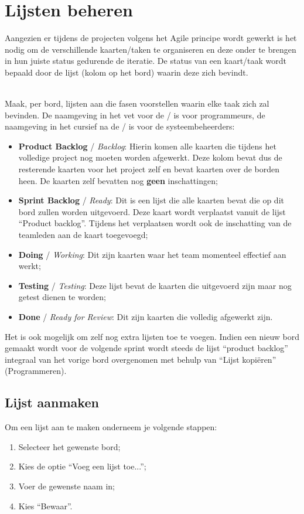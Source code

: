 \chapter{Lijsten beheren}\label{chapter:lijsten_beheren}

Aangezien er tijdens de projecten volgens het Agile principe wordt gewerkt is het nodig om de verschillende kaarten/taken te organiseren en deze onder te brengen in hun juiste status gedurende de iteratie. De status van een kaart/taak wordt bepaald door de lijst (kolom op het bord) waarin deze zich bevindt.

\noindent
\\Maak, per bord, lijsten aan die fasen voorstellen waarin elke taak zich zal bevinden. De naamgeving in het vet voor de / is voor programmeurs, de naamgeving in het cursief na de / is voor de systeembeheerders:
\begin{itemize}
	\item \textbf{Product Backlog} / \textit{Backlog}: Hierin komen alle kaarten die tijdens het volledige project nog moeten worden afgewerkt. Deze kolom bevat dus de resterende kaarten voor het project zelf en bevat kaarten over de borden heen. De kaarten zelf bevatten nog \textbf{geen} inschattingen;
	\item \textbf{Sprint Backlog} / \textit{Ready}: Dit is een lijst die alle kaarten bevat die op dit bord zullen worden uitgevoerd. Deze kaart wordt verplaatst vanuit de lijst ``Product backlog''. Tijdens het verplaatsen wordt ook de inschatting van de teamleden aan de kaart toegevoegd;
	\item \textbf{Doing} / \textit{Working}: Dit zijn kaarten waar het team momenteel effectief aan werkt;
	\item \textbf{Testing} / \textit{Testing}: Deze lijst bevat de kaarten die uitgevoerd zijn maar nog getest dienen te worden;
	\item \textbf{Done} / \textit{Ready for Review}: Dit zijn kaarten die volledig afgewerkt zijn.
\end{itemize}
Het is ook mogelijk om zelf nog extra lijsten toe te voegen. Indien een nieuw bord gemaakt wordt voor de volgende sprint wordt steeds de lijst ``product backlog'' integraal van het vorige bord overgenomen met behulp van ``Lijst kopi\"eren'' (Programmeren).

\section{Lijst aanmaken}
Om een lijst aan te maken onderneem je volgende stappen:
\begin{enumerate}[nolistsep]
	\item Selecteer het gewenste bord;
	\item Kies de optie ``Voeg een lijst toe...'';
	\item Voer de gewenste naam in;
	\item Kies ``Bewaar''.
\end{enumerate}


